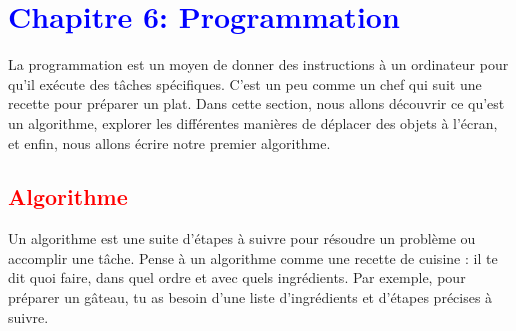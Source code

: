 \documentclass{article}
\begin{document}
\begin{tcolorbox}[colback=green!10!white, colframe=green!75!black, title=\textcolor{white}{Corrections des Exercices avec Graphiques}, sharp corners=south]
\begin{center}
\end{center}
\end{tcolorbox}

\newpage
\section{\textcolor{blue}{Chapitre 6: Programmation}}

La programmation est un moyen de donner des instructions à un ordinateur pour qu'il exécute des tâches spécifiques. C'est un peu comme un chef qui suit une recette pour préparer un plat. Dans cette section, nous allons découvrir ce qu'est un algorithme, explorer les différentes manières de déplacer des objets à l'écran, et enfin, nous allons écrire notre premier algorithme.

\subsection{\textcolor{red}{Algorithme}}

Un algorithme est une suite d'étapes à suivre pour résoudre un problème ou accomplir une tâche. Pense à un algorithme comme une recette de cuisine : il te dit quoi faire, dans quel ordre et avec quels ingrédients. Par exemple, pour préparer un gâteau, tu as besoin d'une liste d'ingrédients et d'étapes précises à suivre.
\end{document}
